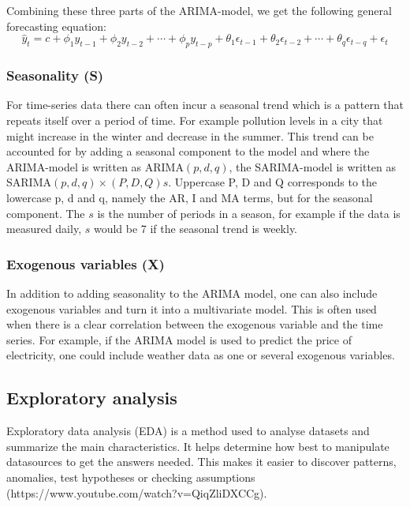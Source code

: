 Combining these three parts of the ARIMA-model, we get the following general forecasting equation:
\begin{equation}
\hat{y}_t = c + \phi_1y_{t-1} + \phi_2y_{t-2} + \cdots + \phi_py_{t-p} + \theta_1\epsilon_{t-1} + \theta_2\epsilon_{t-2} + \cdots + \theta_q\epsilon_{t-q} + \epsilon_t
\end{equation}

\subsubsection{Seasonality (S)}\label{SeasonalityTheory}
For time-series data there can often incur a seasonal trend which is a pattern that repeats itself over a period of time. For example pollution levels in a city that might increase in the winter and decrease in the summer. This trend can be accounted for by adding a seasonal component to the model and where the ARIMA-model is written as ARIMA$(p,d,q)$, the SARIMA-model is written as SARIMA$(p,d,q) \times (P,D,Q)s$. Uppercase P, D and Q corresponds to the lowercase p, d and q, namely the AR, I and MA terms, but for the seasonal component. The $s$ is the number of periods in a season, for example if the data is measured daily, $s$ would be 7 if the seasonal trend is weekly.~\parencite{chang_et_al_2012}

\subsubsection{Exogenous variables (X)}\label{ExogenousTheory}
In addition to adding seasonality to the ARIMA model, one can also include exogenous variables and turn it into a multivariate model. This is often used when there is a clear correlation between the exogenous variable and the time series. For example, if the ARIMA model is used to predict the price of electricity, one could include weather data as one or several exogenous variables.~\parencite{elamin_fukushige_2018}


\subsection{Exploratory analysis}
Exploratory data analysis (EDA) is a method used to analyse datasets and summarize the main characteristics. It helps determine how best to manipulate datasources to get the answers needed. This makes it easier to discover patterns, anomalies, test hypotheses or checking assumptions (https://www.youtube.com/watch?v=QiqZliDXCCg). 


